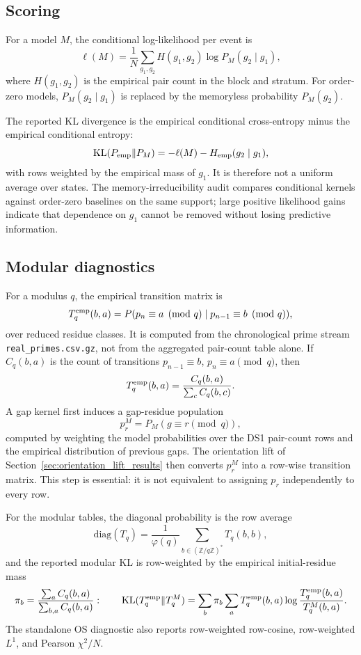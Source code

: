 \documentclass[10pt]{article}
\begin{document}
\subsection{Scoring}
For a model $M$, the conditional log-likelihood per event is
\[
\ell(M)=\frac{1}{N}\sum_{g_1,g_2}H(g_1,g_2)\log P_M(g_2\mid g_1),
\]
where $H(g_1,g_2)$ is the empirical pair count in the block and stratum.  For order-zero models, $P_M(g_2\mid g_1)$ is replaced by the memoryless probability $P_M(g_2)$.

The reported KL divergence is the empirical conditional cross-entropy minus the empirical conditional entropy:
\[
\mathrm{KL}(P_{\rm emp}\Vert P_M)
= -\ell(M)-H_{\rm emp}(g_2\mid g_1),
\]
with rows weighted by the empirical mass of $g_1$.  It is therefore not a uniform average over states.  The memory-irreducibility audit compares conditional kernels against order-zero baselines on the same support; large positive likelihood gains indicate that dependence on $g_1$ cannot be removed without losing predictive information.

\subsection{Modular diagnostics}
For a modulus $q$, the empirical transition matrix is
\[
T_q^{\rm emp}(b,a)=P(p_n\equiv a\pmod q\mid p_{n-1}\equiv b\pmod q),
\]
over reduced residue classes.  It is computed from the chronological prime stream \texttt{real\_primes.csv.gz}, not from the aggregated pair-count table alone.  If $C_q(b,a)$ is the count of transitions $p_{n-1}\equiv b$, $p_n\equiv a\pmod q$, then
\[
T_q^{\rm emp}(b,a)=\frac{C_q(b,a)}{\sum_c C_q(b,c)}.
\]
A gap kernel first induces a gap-residue population
\[
p_r^M=P_M(g\equiv r\pmod q),
\]
computed by weighting the model probabilities over the DS1 pair-count rows and the empirical distribution of previous gaps.  The orientation lift of Section~\ref{sec:orientation_lift_results} then converts $p_r^M$ into a row-wise transition matrix.  This step is essential: it is not equivalent to assigning $p_r$ independently to every row.

For the modular tables, the diagonal probability is the row average
\[
\mathrm{diag}(T_q)=\frac{1}{\varphi(q)}\sum_{b\in(\mathbb Z/q\mathbb Z)^*}T_q(b,b),
\]
and the reported modular KL is row-weighted by the empirical initial-residue mass
\[
\pi_b=\frac{\sum_a C_q(b,a)}{\sum_{b,a}C_q(b,a)}:
\qquad
\mathrm{KL}(T_q^{\rm emp}\Vert T_q^{M})=
\sum_b \pi_b\sum_a T_q^{\rm emp}(b,a)\log\frac{T_q^{\rm emp}(b,a)}{T_q^{M}(b,a)}.
\]
The standalone OS diagnostic also reports row-weighted row-cosine, row-weighted $L^1$, and Pearson $\chi^2/N$.
\end{document}
